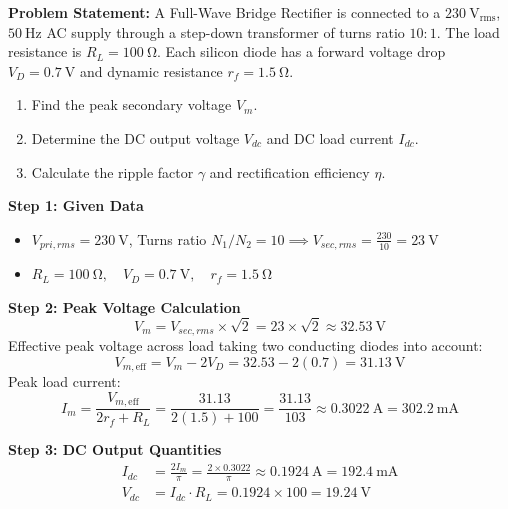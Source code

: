 \begin{example}
\textbf{Problem Statement:} A Full-Wave Bridge Rectifier is connected to a $\SI{230}{\volt}_{\text{rms}}$, $\SI{50}{\hertz}$ AC supply through a step-down transformer of turns ratio $10:1$. The load resistance is $R_L = \SI{100}{\ohm}$. Each silicon diode has a forward voltage drop $V_D = \SI{0.7}{\volt}$ and dynamic resistance $r_f = \SI{1.5}{\ohm}$.
\begin{enumerate}
    \item Find the peak secondary voltage $V_m$.
    \item Determine the DC output voltage $V_{dc}$ and DC load current $I_{dc}$.
    \item Calculate the ripple factor $\gamma$ and rectification efficiency $\eta$.
\end{enumerate}

\tcblower
\textbf{Step 1: Given Data}
\begin{itemize}
    \item $V_{pri,rms} = \SI{230}{\volt}$, Turns ratio $N_1/N_2 = 10 \implies V_{sec,rms} = \frac{230}{10} = \SI{23}{\volt}$
    \item $R_L = \SI{100}{\ohm}, \quad V_D = \SI{0.7}{\volt}, \quad r_f = \SI{1.5}{\ohm}$
\end{itemize}

\textbf{Step 2: Peak Voltage Calculation}
\begin{equation*}
    V_m = V_{sec,rms} \times \sqrt{2} = 23 \times \sqrt{2} \approx \SI{32.53}{\volt}
\end{equation*}
Effective peak voltage across load taking two conducting diodes into account:
\begin{equation*}
    V_{m,\text{eff}} = V_m - 2V_D = 32.53 - 2(0.7) = \SI{31.13}{\volt}
\end{equation*}
Peak load current:
\begin{equation*}
    I_m = \frac{V_{m,\text{eff}}}{2r_f + R_L} = \frac{31.13}{2(1.5) + 100} = \frac{31.13}{103} \approx \SI{0.3022}{\ampere} = \SI{302.2}{\milli\ampere}
\end{equation*}

\textbf{Step 3: DC Output Quantities}
\begin{align*}
    I_{dc} &= \frac{2I_m}{\pi} = \frac{2 \times 0.3022}{\pi} \approx \SI{0.1924}{\ampere} = \SI{192.4}{\milli\ampere} \\
    V_{dc} &= I_{dc} \cdot R_L = 0.1924 \times 100 = \SI{19.24}{\volt}
\end{align*}


\end{example}
